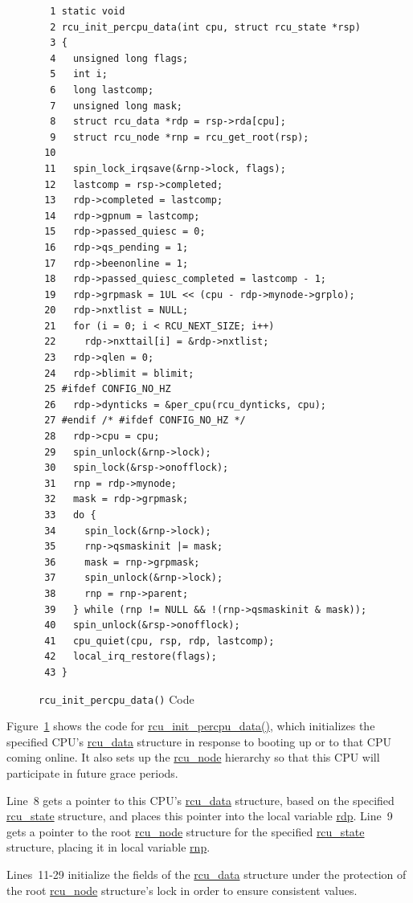 \begin{figure}[tbp]
{ \scriptsize
\begin{verbatim}
  1 static void
  2 rcu_init_percpu_data(int cpu, struct rcu_state *rsp)
  3 {
  4   unsigned long flags;
  5   int i;
  6   long lastcomp;
  7   unsigned long mask;
  8   struct rcu_data *rdp = rsp->rda[cpu];
  9   struct rcu_node *rnp = rcu_get_root(rsp);
 10 
 11   spin_lock_irqsave(&rnp->lock, flags);
 12   lastcomp = rsp->completed;
 13   rdp->completed = lastcomp;
 14   rdp->gpnum = lastcomp;
 15   rdp->passed_quiesc = 0;
 16   rdp->qs_pending = 1;
 17   rdp->beenonline = 1;
 18   rdp->passed_quiesc_completed = lastcomp - 1;
 19   rdp->grpmask = 1UL << (cpu - rdp->mynode->grplo);
 20   rdp->nxtlist = NULL;
 21   for (i = 0; i < RCU_NEXT_SIZE; i++)
 22     rdp->nxttail[i] = &rdp->nxtlist;
 23   rdp->qlen = 0;
 24   rdp->blimit = blimit;
 25 #ifdef CONFIG_NO_HZ
 26   rdp->dynticks = &per_cpu(rcu_dynticks, cpu);
 27 #endif /* #ifdef CONFIG_NO_HZ */
 28   rdp->cpu = cpu;
 29   spin_unlock(&rnp->lock);
 30   spin_lock(&rsp->onofflock);
 31   rnp = rdp->mynode;
 32   mask = rdp->grpmask;
 33   do {
 34     spin_lock(&rnp->lock);
 35     rnp->qsmaskinit |= mask;
 36     mask = rnp->grpmask;
 37     spin_unlock(&rnp->lock);
 38     rnp = rnp->parent;
 39   } while (rnp != NULL && !(rnp->qsmaskinit & mask));
 40   spin_unlock(&rsp->onofflock);
 41   cpu_quiet(cpu, rsp, rdp, lastcomp);
 42   local_irq_restore(flags);
 43 }
\end{verbatim}
}
\caption{{\tt rcu\_init\_percpu\_data()} Code}
\label{fig:app:rcuimpl:rcutreewt:Code for rcu-init-percpu-data}
\end{figure}

Figure~\ref{fig:app:rcuimpl:rcutreewt:Code for rcu-init-percpu-data}
shows the code for \url{rcu_init_percpu_data()}, which initializes
the specified CPU's \url{rcu_data} structure in response to booting
up or to that CPU coming online.
It also sets up the \url{rcu_node} hierarchy so that this CPU will
participate in future grace periods.

Line~8 gets a pointer to this CPU's \url{rcu_data} structure, based
on the specified \url{rcu_state} structure, and places this pointer
into the local variable \url{rdp}.
Line~9 gets a pointer to the root \url{rcu_node} structure for the
specified \url{rcu_state} structure, placing it in local variable
\url{rnp}.

Lines~11-29 initialize the fields of the \url{rcu_data} structure
under the protection of the root \url{rcu_node} structure's lock
in order to ensure consistent values.

